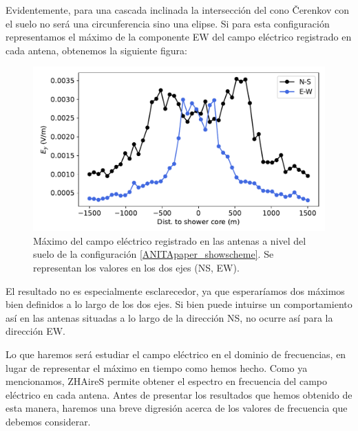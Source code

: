 \documentclass[12 pt, a4paper]{article} %
\numberwithin{equation}{section}
\numberwithin{figure}{section}
\numberwithin{table}{section}
\begin{document}
Evidentemente, para una cascada inclinada la intersección del cono \v{C}erenkov con el suelo no será una circunferencia sino una elipse. Si para esta configuración representamos el máximo de la componente EW del campo eléctrico registrado en cada antena, obtenemos la siguiente figura:
\begin{figure}[H]
	\centering
	\includegraphics[width=.65\linewidth]{figures/radio/downgoing_p_10EeV_70deg_Ey_t_ground}
	\caption{Máximo del campo eléctrico registrado en las antenas a nivel del suelo de la configuración \ref{ANITApaper_showscheme}. Se representan los valores en los dos ejes (NS, EW).}
	\label{downgoing_p_10EeV_70deg_Ey_t_ground}
\end{figure}
El resultado no es especialmente esclarecedor, ya que esperaríamos dos máximos bien definidos a lo largo de los dos ejes. Si bien puede intuirse un comportamiento así en las antenas situadas a lo largo de la dirección NS, no ocurre así para la dirección EW.

Lo que haremos será estudiar el campo eléctrico en el dominio de frecuencias, en lugar de representar el máximo en tiempo como hemos hecho. Como ya mencionamos, ZHAireS permite obtener el espectro en frecuencia del campo eléctrico en cada antena. Antes de presentar los resultados que hemos obtenido de esta manera, haremos una breve digresión acerca de los valores de frecuencia que debemos considerar.
\end{document}
